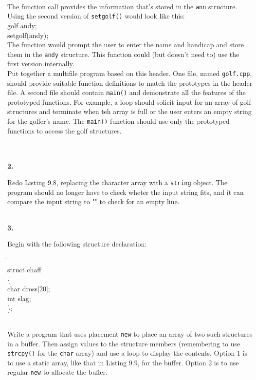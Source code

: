 \documentclass[10 pt]{amsart}
\newlength{\cwidth}
\newenvironment{cpart}[2][\cwidth]
	{\\ \noindent\phantom{\qquad}\textbf{#2. }\begin{minipage}[t]{#1}}
	{\end{minipage}}
\newenvironment{cpartContinued}[2][\cwidth]
	{\\ \noindent\phantom{\qquad}%
		\phantom{\textbf{#2. }}\begin{minipage}[t]{#1}}
	{\end{minipage}}
\newcommand{\ttt}[1]{\texttt{#1}}
\begin{document}
	\begin{cpartContinued}{1}
		The function call provides the information that's stored in the 
		\ttt{ann} structure.
		Using the second version of \ttt{setgolf()} would look like
		this: \\[2ex]
		{\ttfamily
			golf andy; \\
			setgolf(andy);
		} \\[2ex]
		The function would prompt the user to enter the name and handicap
		and store them in the \ttt{andy} structure.
		This function could (but doesn't need to) use the first
		version internally. \\[2ex]
		Put together a multifile program based on this header.
		One file, named \ttt{golf.cpp}, should provide suitable
		function definitions to match the prototypes
		in the header file.
		A second file should contain \ttt{main()} and demonstrate all 
		the features of the prototyped functions.
		For example, a loop should solicit input for an array of golf
		structures and terminate when teh array is full or the
		user enters an empty string for the golfer's name.
		The \ttt{main()} function should use only the prototyped 
		functions to access the golf structures.
	\end{cpartContinued} 
	\\[2ex]

	\begin{cpart}{2}
		Redo Listing 9.8, replacing the character array with a
		\ttt{string} object.
		The program should no longer have to check wheter the input
		string fits, and it can compare the input string to "" to 
		check for an empty line.
	\end{cpart}
	\vspace{2ex}

	\begin{cpart}{3}
		Begin with the following structure declaration:
		{\ttfamily
			\begin{tabbing}
				\phantom{\qquad}\=\phantom{\qquad}\=\phantom{\qquad}\= \\
				struct chaff \\
				\{ \\
				\> 	char dross[20]; \\
				\> 	int slag; \\
				\};
			\end{tabbing}
		}
		\phantom{\quad} \\
		Write a program that uses placement \ttt{new} to place
		an array of two such structures in a buffer.
		Then assign values to the structure members (remembering to
		use \ttt{strcpy()} for the \ttt{char} array) and use
		a loop to display the contents.
		Option 1 is to use a static array, like that in Listing 9.9,
		for the buffer.
		Option 2 is to use regular \ttt{new} to allocate the buffer.
	\end{cpart}
	\vfill
	\newpage
\end{document}
